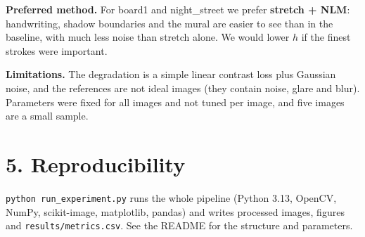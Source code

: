 \documentclass[10pt,a4paper]{article}
\begin{document}
\begin{table}[H]\centering
\caption{Sensitivity of the luminance stretch to percentile clipping (mean over the five images).}\label{tab:s}\end{table}

\textbf{Preferred method.} For board1 and night\_street we prefer \textbf{stretch + NLM}: handwriting, shadow boundaries and the mural are easier to see than in the baseline, with much less noise than stretch alone. We would lower $h$ if the finest strokes were important.

\textbf{Limitations.} The degradation is a simple linear contrast loss plus Gaussian noise, and the references are not ideal images (they contain noise, glare and blur). Parameters were fixed for all images and not tuned per image, and five images are a small sample.

\section*{5. Reproducibility}
\texttt{python run\_experiment.py} runs the whole pipeline (Python 3.13, OpenCV, NumPy, scikit-image, matplotlib, pandas) and writes processed images, figures and \texttt{results/metrics.csv}. See the README for the structure and parameters.
\end{document}
